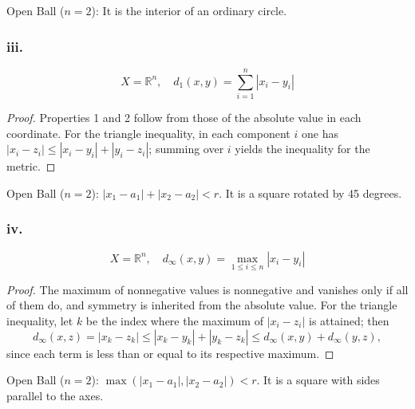 \documentclass[11pt, a4paper]{article}
\begin{document}
Open Ball ($n=2$): It is the interior of an ordinary circle.

\subsubsection*{iii.}
$$ X = \mathbb{R}^n, \quad d_1(x, y) = \sum_{i=1}^n |x_i - y_i| $$

\begin{proof}
Properties 1 and 2 follow from those of the absolute value in each coordinate. For the triangle inequality,
in each component $i$ one has $|x_i - z_i| \le |x_i - y_i| + |y_i - z_i|$; summing over $i$ yields
the inequality for the metric.
\end{proof}

Open Ball ($n=2$): $|x_1 - a_1| + |x_2 - a_2| < r$. It is a square rotated by 45 degrees.
\subsubsection*{iv.}
$$ X = \mathbb{R}^n, \quad d_\infty(x, y) = \max_{1 \le i \le n} |x_i - y_i| $$

\begin{proof}
The maximum of nonnegative values is nonnegative and vanishes only if all of them do, and symmetry is
inherited from the absolute value. For the triangle inequality, let $k$ be the index where the maximum of
$|x_i - z_i|$ is attained; then
$$ d_\infty(x, z) = |x_k - z_k| \le |x_k - y_k| + |y_k - z_k| \le d_\infty(x, y) + d_\infty(y, z), $$
since each term is less than or equal to its respective maximum.
\end{proof}

Open Ball ($n=2$): $\max(|x_1 - a_1|, |x_2 - a_2|) < r$. It is a square with sides parallel to the
axes.

\begin{figure}[H]
\centering
{}
\end{figure}
\end{document}
